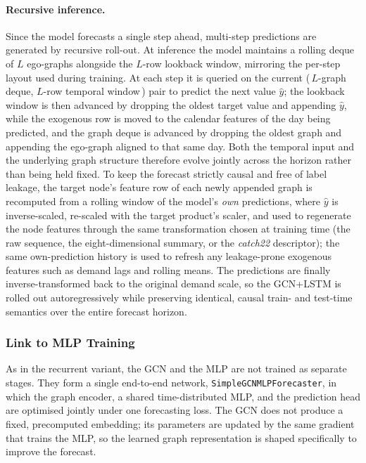 \paragraph{Recursive inference.}
Since the model forecasts a single step ahead, multi-step predictions are
generated by recursive roll-out. At inference the model maintains a rolling
deque of $L$ ego-graphs alongside the $L$-row lookback window, mirroring the
per-step layout used during training. At each step it is queried on the current
(\,$L$-graph deque, $L$-row temporal window\,) pair to predict the next value
$\hat{y}$; the lookback window is then advanced by dropping the oldest target
value and appending $\hat{y}$, while the exogenous row is moved to the calendar
features of the day being predicted, and the graph deque is advanced by dropping
the oldest graph and appending the ego-graph aligned to that same day. Both the
temporal input and the underlying graph structure therefore evolve jointly
across the horizon rather than being held fixed. To keep the forecast strictly
causal and free of label leakage, the target node's feature row of each newly
appended graph is recomputed from a rolling window of the model's \emph{own}
predictions, where $\hat{y}$ is inverse-scaled, re-scaled with the target
product's scaler, and used to regenerate the node features through the same
transformation chosen at training time (the raw sequence, the eight-dimensional
summary, or the \textit{catch22} descriptor); the same own-prediction history
is used to refresh any leakage-prone exogenous features such as demand lags and
rolling means. The predictions are finally inverse-transformed back to the
original demand scale, so the GCN+LSTM is rolled out autoregressively while
preserving identical, causal train- and test-time semantics over the entire
forecast horizon.
\subsubsection{Link to MLP Training}
\label{sec:gcn_mlp_link}

As in the recurrent variant, the GCN and the MLP are not trained as separate
stages. They form a single end-to-end network, \texttt{SimpleGCNMLPForecaster},
in which the graph encoder, a shared time-distributed MLP, and the prediction
head are optimised jointly under one forecasting loss. The GCN does not produce
a fixed, precomputed embedding; its parameters are updated by the same gradient
that trains the MLP, so the learned graph representation is shaped specifically
to improve the forecast.

